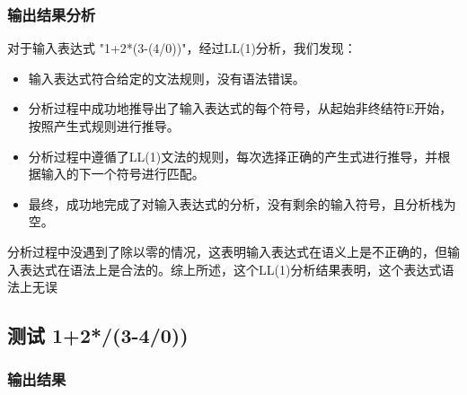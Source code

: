 \documentclass[lang=cn,11pt,a4paper]{elegantpaper}
\begin{document}
\subsubsection{输出结果分析}

对于输入表达式 "1+2*(3-(4/0))"，经过LL(1)分析，我们发现：
\begin{itemize}
    \item 输入表达式符合给定的文法规则，没有语法错误。
    \item 分析过程中成功地推导出了输入表达式的每个符号，从起始非终结符E开始，按照产生式规则进行推导。
    \item 分析过程中遵循了LL(1)文法的规则，每次选择正确的产生式进行推导，并根据输入的下一个符号进行匹配。
    \item 最终，成功地完成了对输入表达式的分析，没有剩余的输入符号，且分析栈为空。
\end{itemize}

分析过程中没遇到了除以零的情况，这表明输入表达式在语义上是不正确的，但输入表达式在语法上是合法的。综上所述，这个LL(1)分析结果表明，这个表达式语法上无误

\subsection{测试 1+2*/(3-4/0))}

\subsubsection{输出结果}
\end{document}
